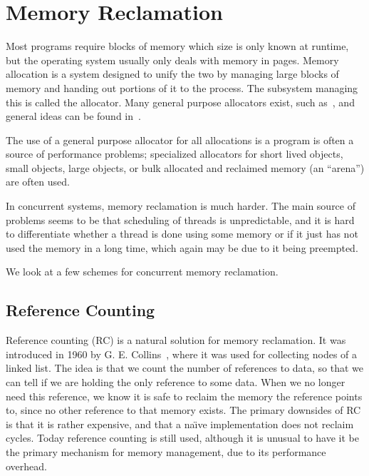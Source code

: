 \section{Memory Reclamation\label{sec:background-memory-reclamation}}

Most programs require blocks of memory which size is only known at runtime, but the operating
system usually only deals with memory in pages. Memory allocation is a system designed to unify the
two by managing large blocks of memory and handing out portions of it to the process. The subsystem
managing this is called the allocator. Many general purpose allocators exist, such as~\cite{glibc-malloc,jemalloc,tcmalloc}, and general ideas can be found in~\cite{knuth1997vol1}.

The use of a general purpose allocator for all allocations is a program is often a source of
performance problems; specialized allocators for short lived objects, small objects, large objects,
or bulk allocated and reclaimed memory (an ``arena'') are often used.

In concurrent systems, memory reclamation is much harder. The main source of problems seems to be
that scheduling of threads is unpredictable, and it is hard to differentiate whether a thread is
done using some memory or if it just has not used the memory in a long time, which again may be due
to it being preempted.

We look at a few schemes for concurrent memory reclamation.


\subsection{Reference Counting\label{sec:background-rc}}

Reference counting (RC) is a natural solution for memory reclamation. It was introduced in 1960 by
G. E.  Collins~\cite{collins1960method}, where it was used for collecting nodes of a linked list.
The idea is that we count the number of references to data, so that we can tell if we are holding
the only reference to some data. When we no longer need this reference, we know it is safe to
reclaim the memory the reference points to, since no other reference to that memory exists. The
primary downsides of RC is that it is rather expensive, and that a na\"\i{}ve implementation does
not reclaim cycles. Today reference counting is still used, although it is unusual to have it be
the primary mechanism for memory management, due to its performance overhead.


